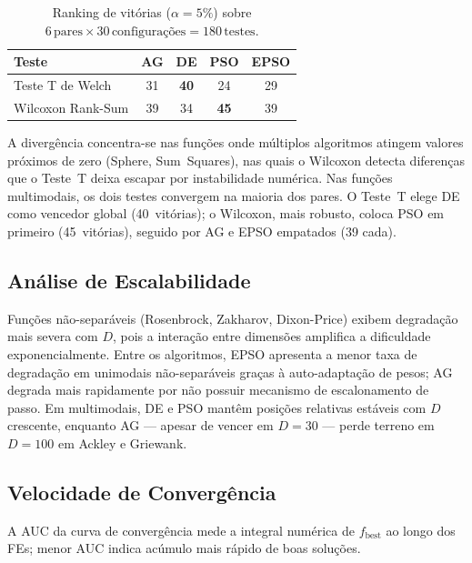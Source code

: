 \documentclass[runningheads]{llncs}
\begin{document}
\begin{table}[H]
\caption{Ranking de vitórias ($\alpha=5\%$) sobre
$6\,\text{pares}\times30\,\text{configurações}=180\,\text{testes}$.}
\label{tab:ranking}
\centering
\begin{tabular}{lcccc}
\toprule
\textbf{Teste} & \textbf{AG} & \textbf{DE} & \textbf{PSO} & \textbf{EPSO} \\
\midrule
Teste T de Welch  & 31 & \textbf{40} & 24 & 29 \\
Wilcoxon Rank-Sum & 39 & 34 & \textbf{45} & 39 \\
\bottomrule
\end{tabular}
\end{table}

A divergência concentra-se nas funções onde múltiplos algoritmos
atingem valores próximos de zero (Sphere, Sum~Squares), nas quais
o Wilcoxon detecta diferenças que o Teste~T deixa escapar por
instabilidade numérica. Nas funções multimodais, os dois testes
convergem na maioria dos pares. O Teste~T elege DE como vencedor
global (40~vitórias); o Wilcoxon, mais robusto, coloca PSO em
primeiro (45~vitórias), seguido por AG e EPSO empatados (39 cada).

\subsection{An\'{a}lise de Escalabilidade}


Funções não-separáveis (Rosenbrock, Zakharov, Dixon-Price) exibem
degradação mais severa com $D$, pois a interação entre dimensões
amplifica a dificuldade exponencialmente. Entre os algoritmos, EPSO
apresenta a menor taxa de degradação em unimodais não-separáveis
graças à auto-adaptação de pesos; AG degrada mais rapidamente por
não possuir mecanismo de escalonamento de passo. Em multimodais,
DE e PSO mantêm posições relativas estáveis com $D$ crescente,
enquanto AG — apesar de vencer em $D=30$ — perde terreno em $D=100$
em Ackley e Griewank.

\subsection{Velocidade de Converg\^{e}ncia}

A AUC da curva de convergência mede a integral numérica de
$f_\text{best}$ ao longo dos FEs; menor AUC indica acúmulo mais
rápido de boas soluções.
\end{document}
